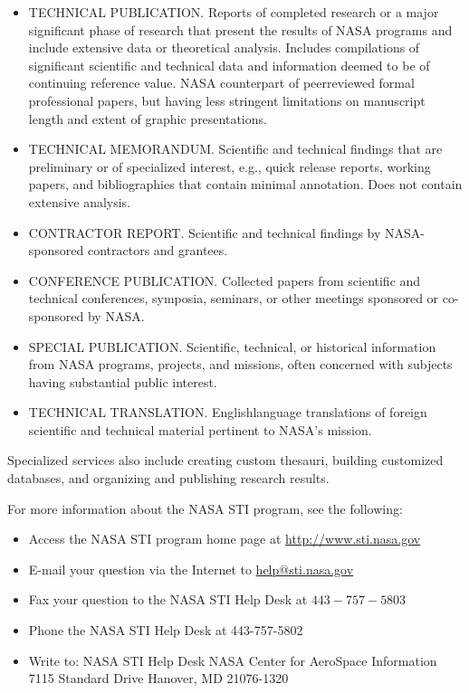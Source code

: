\documentclass[10pt]{article}
\begin{document}
\begin{itemize}
  \item TECHNICAL PUBLICATION. Reports of completed research or a major significant phase of research that present the results of NASA programs and include extensive data or theoretical analysis. Includes compilations of significant scientific and technical data and information deemed to be of continuing reference value. NASA counterpart of peerreviewed formal professional papers, but having less stringent limitations on manuscript length and extent of graphic presentations.

  \item TECHNICAL MEMORANDUM. Scientific and technical findings that are preliminary or of specialized interest, e.g., quick release reports, working papers, and bibliographies that contain minimal annotation. Does not contain extensive analysis.

  \item CONTRACTOR REPORT. Scientific and technical findings by NASA-sponsored contractors and grantees.

  \item CONFERENCE PUBLICATION. Collected papers from scientific and technical conferences, symposia, seminars, or other meetings sponsored or co-sponsored by NASA.

  \item SPECIAL PUBLICATION. Scientific, technical, or historical information from NASA programs, projects, and missions, often concerned with subjects having substantial public interest.

  \item TECHNICAL TRANSLATION. Englishlanguage translations of foreign scientific and technical material pertinent to NASA's mission.

\end{itemize}

Specialized services also include creating custom thesauri, building customized databases, and organizing and publishing research results.

For more information about the NASA STI program, see the following:

\begin{itemize}
  \item Access the NASA STI program home page at \href{http://www.sti.nasa.gov}{http://www.sti.nasa.gov}

  \item E-mail your question via the Internet to \href{mailto:help@sti.nasa.gov}{help@sti.nasa.gov}

  \item Fax your question to the NASA STI Help Desk at $443-757-5803$

  \item Phone the NASA STI Help Desk at 443-757-5802

  \item Write to: NASA STI Help Desk NASA Center for AeroSpace Information 7115 Standard Drive Hanover, MD 21076-1320

\end{itemize}
\end{document}

